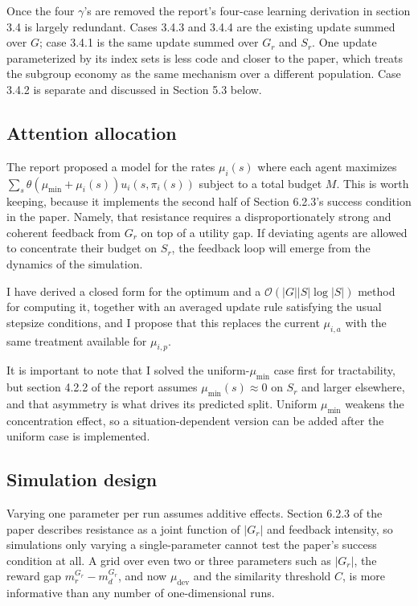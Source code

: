 \documentclass[12pt]{article}
\begin{document}
Once the four $\gamma$'s are removed the report's four-case learning derivation in section 3.4 is largely redundant. Cases 3.4.3 and 3.4.4
are the existing update summed over $G$; case 3.4.1 is the same update summed over $G_r$ and $S_r$. One
update parameterized by its index sets is less code and closer to the paper, which treats the subgroup
economy as the same mechanism over a different population. Case 3.4.2 is separate and discussed in Section 5.3 below.

\subsection{Attention allocation}
The report proposed a model for the rates $\mu_i(s)$ where each agent maximizes $\sum_{s} \theta(\mu_\text{min} + \mu_i(s)) u_i(s,\pi_i(s))$ subject
to a total budget $M$. This is worth keeping, because it implements the second half of Section 6.2.3's success
condition in the paper. Namely, that resistance requires a disproportionately strong and coherent feedback from
$G_r$ on top of a utility gap. If deviating agents are allowed to concentrate their budget on $S_r$,  the feedback loop will emerge from the dynamics of the simulation.
 
I have derived a closed form for the optimum and a $\mathcal O(|G||S|\log|S|)$ method for computing it, together with an averaged update rule
satisfying the usual stepsize conditions, and I propose that this replaces the current $\mu_{i,a}$ with the
same treatment available for $\mu_{i,p}$.

It is important to note that I solved the uniform-$\mu_\text{min}$ case
first for tractability, but section 4.2.2 of the report assumes $\mu_\text{min}(s) \approx 0$ on $S_r$ and larger
elsewhere, and that asymmetry is what drives its predicted split. Uniform $\mu_\text{min}$ weakens the
concentration effect, so a situation-dependent version can be added after the uniform case is implemented.

\subsection{Simulation design}
Varying one parameter per run assumes additive effects. Section 6.2.3 of the paper describes resistance as a joint function
of $|G_r|$ and feedback intensity, so simulations only varying a single-parameter cannot test the paper's success condition at
all. A grid over even two or three parameters such as  $|G_r|$, the reward gap $m_r^{G_r} - m_d^{G_r}$, and now
$\mu_\text{dev}$ and the similarity threshold $C$, is more informative than any number of one-dimensional
runs.
 
\end{document}
